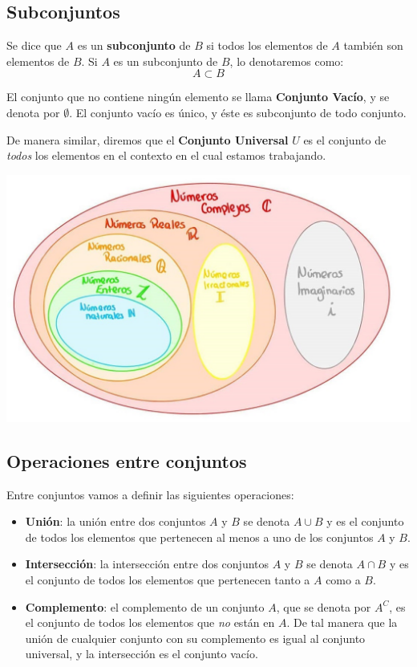 \documentclass[12pt]{article}
\theoremstyle{definition}
\begin{document}
\subsection{Subconjuntos}
Se dice que $A$ es un \textbf{subconjunto} de $B$ si todos los elementos de $A$ tambi\'en son elementos de $B$. Si $A$ es un subconjunto de $B$, lo denotaremos como:
$$A \subset B$$

El conjunto que no contiene ning\'un elemento se llama \textbf{Conjunto Vac\'io}, y se denota por $\emptyset$. El conjunto vac\'io es \'unico, y \'este es subconjunto de todo conjunto.

De manera similar, diremos que el \textbf{Conjunto Universal} $U$ es el conjunto de \textit{todos} los elementos en el contexto en el cual estamos trabajando.

\begin{center}
	\includegraphics[scale=0.5]{conjuntos.jpg}
\end{center}

\subsection{Operaciones entre conjuntos}
Entre conjuntos vamos a definir las siguientes operaciones:
\begin{itemize}
	\item \textbf{Uni\'on}: la uni\'on entre dos conjuntos $A$ y $B$ se denota $A \cup B$ y es el conjunto de todos los elementos que pertenecen al menos a uno de los conjuntos $A$ y $B$.
	\item \textbf{Intersecci\'on}: la intersecci\'on entre dos conjuntos $A$ y $B$ se denota $A \cap B$ y es el conjunto de todos los elementos que pertenecen tanto a $A$ como a $B$.
	\item \textbf{Complemento}: el complemento de un conjunto $A$, que se denota por $A^C$, es el conjunto de todos los elementos que \textit{no} est\'an en $A$. De tal manera que la uni\'on de cualquier conjunto con su complemento es igual al conjunto universal, y la intersecci\'on es el conjunto vac\'io.
\end{itemize}
\end{document}
